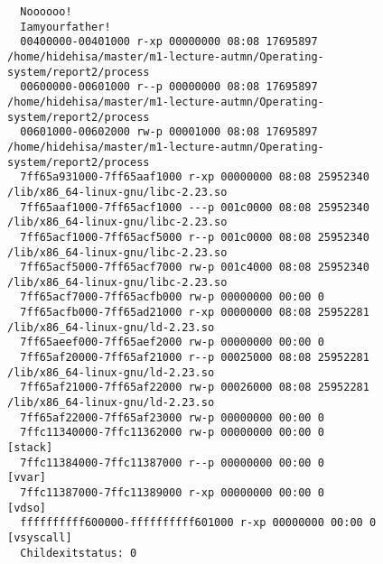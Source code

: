 \documentclass[10pt,a4paper]{ltjsarticle}       %
\begin{document}
  \begin{lstlisting}
  Noooooo!
  Iamyourfather!
  00400000-00401000 r-xp 00000000 08:08 17695897                           /home/hidehisa/master/m1-lecture-autmn/Operating-system/report2/process
  00600000-00601000 r--p 00000000 08:08 17695897                           /home/hidehisa/master/m1-lecture-autmn/Operating-system/report2/process
  00601000-00602000 rw-p 00001000 08:08 17695897                           /home/hidehisa/master/m1-lecture-autmn/Operating-system/report2/process
  7ff65a931000-7ff65aaf1000 r-xp 00000000 08:08 25952340                   /lib/x86_64-linux-gnu/libc-2.23.so
  7ff65aaf1000-7ff65acf1000 ---p 001c0000 08:08 25952340                   /lib/x86_64-linux-gnu/libc-2.23.so
  7ff65acf1000-7ff65acf5000 r--p 001c0000 08:08 25952340                   /lib/x86_64-linux-gnu/libc-2.23.so
  7ff65acf5000-7ff65acf7000 rw-p 001c4000 08:08 25952340                   /lib/x86_64-linux-gnu/libc-2.23.so
  7ff65acf7000-7ff65acfb000 rw-p 00000000 00:00 0
  7ff65acfb000-7ff65ad21000 r-xp 00000000 08:08 25952281                   /lib/x86_64-linux-gnu/ld-2.23.so
  7ff65aeef000-7ff65aef2000 rw-p 00000000 00:00 0
  7ff65af20000-7ff65af21000 r--p 00025000 08:08 25952281                   /lib/x86_64-linux-gnu/ld-2.23.so
  7ff65af21000-7ff65af22000 rw-p 00026000 08:08 25952281                   /lib/x86_64-linux-gnu/ld-2.23.so
  7ff65af22000-7ff65af23000 rw-p 00000000 00:00 0
  7ffc11340000-7ffc11362000 rw-p 00000000 00:00 0                          [stack]
  7ffc11384000-7ffc11387000 r--p 00000000 00:00 0                          [vvar]
  7ffc11387000-7ffc11389000 r-xp 00000000 00:00 0                          [vdso]
  ffffffffff600000-ffffffffff601000 r-xp 00000000 00:00 0                  [vsyscall]
  Childexitstatus: 0
  \end{lstlisting}
\end{document}
